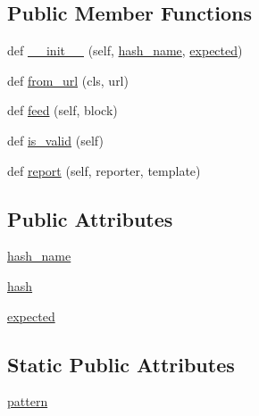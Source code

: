 \subsection*{Public Member Functions}
\begin{DoxyCompactItemize}
\item 
def \hyperlink{classsetuptools_1_1package__index_1_1HashChecker_a7e9ce6338bf56b374758ac916dc6ab80}{\+\_\+\+\_\+init\+\_\+\+\_\+} (self, \hyperlink{classsetuptools_1_1package__index_1_1HashChecker_a42deccfa15fe220e91ebe932790577a3}{hash\+\_\+name}, \hyperlink{classsetuptools_1_1package__index_1_1HashChecker_ae1723599c7c9ce64760276a0325f58dc}{expected})
\item 
def \hyperlink{classsetuptools_1_1package__index_1_1HashChecker_af5123e3a85ab6ab53545efc45781e113}{from\+\_\+url} (cls, url)
\item 
def \hyperlink{classsetuptools_1_1package__index_1_1HashChecker_ab85ad235e2596bf0adc4b69aa23f9600}{feed} (self, block)
\item 
def \hyperlink{classsetuptools_1_1package__index_1_1HashChecker_a6da0aaa415974e755b5eb11ddadf0826}{is\+\_\+valid} (self)
\item 
def \hyperlink{classsetuptools_1_1package__index_1_1HashChecker_a6d7009b9387567ecf6d659b2210b6548}{report} (self, reporter, template)
\end{DoxyCompactItemize}
\subsection*{Public Attributes}
\begin{DoxyCompactItemize}
\item 
\hyperlink{classsetuptools_1_1package__index_1_1HashChecker_a42deccfa15fe220e91ebe932790577a3}{hash\+\_\+name}
\item 
\hyperlink{classsetuptools_1_1package__index_1_1HashChecker_a591f6506d010b8452ac48ddb469bb5a7}{hash}
\item 
\hyperlink{classsetuptools_1_1package__index_1_1HashChecker_ae1723599c7c9ce64760276a0325f58dc}{expected}
\end{DoxyCompactItemize}
\subsection*{Static Public Attributes}
\begin{DoxyCompactItemize}
\item 
\hyperlink{classsetuptools_1_1package__index_1_1HashChecker_addd5cbb7153e31acac4e78f5dcb292d9}{pattern}
\end{DoxyCompactItemize}


